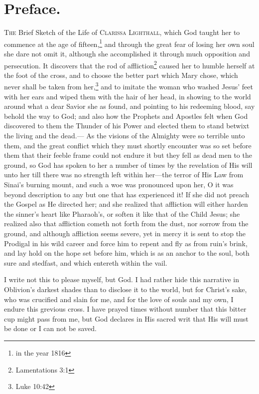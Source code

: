 \section*{Preface.}
\textsc{The} Brief Sketch of the Life of \textsc{Clarissa Lighthall}, which God taught her to commence at the age of fifteen,\footnote{in the year 1816} and through the great fear of losing her own soul she dare not omit it, although she accomplished it through much opposition and persecution.
It discovers that the rod of affliction\footnote{Lamentations 3:1} caused her to humble herself at the foot of the cross, and to choose the better part which Mary chose, which never shall be taken from her,\footnote{Luke 10:42} and to imitate the woman who washed Jesus' feet with her ears and wiped them with the hair of her head, in showing to the world around what a dear Savior she as found, and pointing to his redeeming blood, say behold the way to God; and also how the Prophets and Apostles felt when God discovered to them the Thunder of his Power and elected them to stand betwixt the living and the dead.---
As the visions of the Almighty were so terrible unto them, and the great conflict which they must shortly encounter was so set before them that their feeble frame could not endure it but they fell as dead men to the ground, so God has spoken to her a number of times by the revelation of His will unto her till there was no strength left within her---the terror of His Law from Sinai's burning mount, and such a woe was pronounced upon her, O it was beyond description to any but one that has experienced it!
If she did not preach the Gospel as He directed her; and she realized that affliction will either harden the sinner's heart like Pharaoh's, or soften it like that of the Child Jesus; she realized also that affliction cometh not forth from the dust, nor sorrow from the ground, and although affliction seems severe, yet in mercy it is sent to stop the Prodigal in his wild career and force him to repent and fly as from ruin's brink, and lay hold on the hope set before him, which is as an anchor to the soul, both sure and stedfast, and which entereth within the vail.

I write not this to please myself, but God.
I had rather hide this narrative in Oblivion's darkest shades than to disclose it to the world, but for Christ's sake, who was crucified and slain for me, and for the love of souls and my own, I endure this grevious cross.
I have prayed times without number that this bitter cup might pass from me, but God declares in His sacred writ that His will must be done or I can not be saved.

